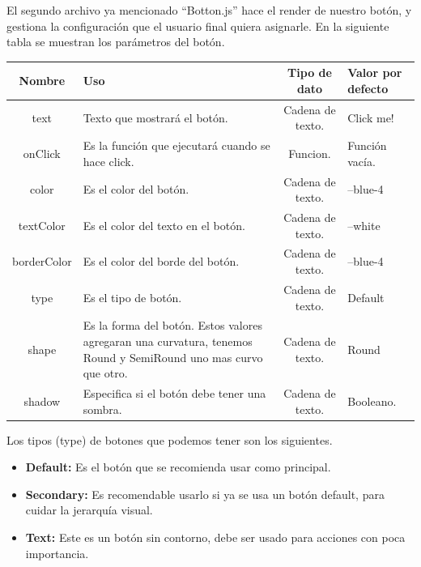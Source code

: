 El segundo archivo ya mencionado “Botton.js”  hace el render de nuestro botón, y gestiona la configuración que el usuario final quiera asignarle.
En la siguiente tabla se muestran los parámetros del botón.
\newline
\newline
\begin{center}
 \begin{tabular}{ | c |  p{5cm}  | c | p{3cm} |} 
 \hline
 \textbf{Nombre} &  \textbf{Uso} &  \textbf{ Tipo de dato} &  \textbf{Valor por defecto}\\ [0.5ex] 
 \hline\hline
text & Texto que mostrará el botón.  &  Cadena de texto. & Click me! \\  [2.5ex] 
 \hline
onClick & Es la función que ejecutará cuando se hace click. & Funcion. & Función vacía. \\[2.5ex] 
 \hline
color &  Es el color del botón. & Cadena de texto. & --blue-4 \\[3.5ex] 
 \hline
 textColor & Es el color del texto en el botón. &  Cadena de texto. & --white \\[2.5ex] 
 \hline
borderColor & Es el color del borde del botón. & Cadena de texto. & --blue-4 \\ [2.5ex] 
 \hline
 type & Es el tipo de botón. & Cadena de texto. & Default \\ [2.5ex] 
 \hline
 shape & Es la forma del botón. Estos valores agregaran una curvatura, tenemos Round y SemiRound uno mas curvo que otro. & Cadena de texto. & Round \\ [2.5ex] 
 \hline
 shadow & Especifica si el botón debe tener una sombra. & Cadena de texto. & Booleano. \\ [2.5ex] 
 \hline
\end{tabular}
\end{center}
\newline
\newline
\newline
Los tipos (type) de botones que podemos tener son los siguientes.
\begin{itemize}
\item \textbf{Default:} Es el botón que se recomienda usar como principal.
\item \textbf{Secondary:} Es recomendable usarlo si ya se usa un botón default, para cuidar la jerarquía visual.
\item \textbf{Text:} Este es un botón sin contorno, debe ser usado para acciones con poca importancia.
\end{itemize}
\newline
